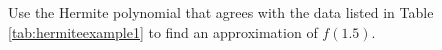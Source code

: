 %
%
%
%
%
%
%
%
%
%
%
%
%
%
%
\begin{example}\label{exam:hermite1}
Use the Hermite polynomial that agrees with the data listed in Table \ref{tab:hermiteexample1} to find an approximation of $f(1.5)$.
\end{example}


